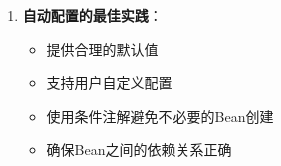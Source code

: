 \begin{enumerate}
\begin{itemize} \tightlist \item 在创建Bean时不仅设置了基本属性，还可以设置默认值、验证规则等。 \item 这确保了即使用户没有提供完整配置，系统也能以合理的默认值运行。 \end{itemize}
\item \textbf{自动配置的最佳实践}： \begin{itemize} \tightlist \item 提供合理的默认值 \item 支持用户自定义配置 \item 使用条件注解避免不必要的Bean创建 \item
确保Bean之间的依赖关系正确 \end{itemize} \end{enumerate}
